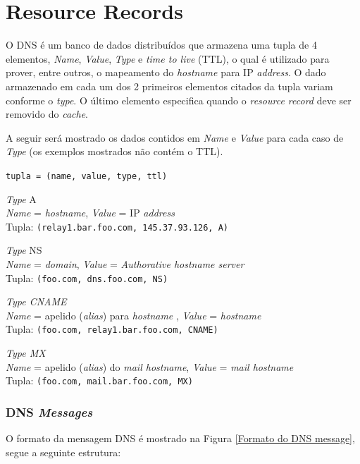 \hypertarget{resource-records}{%
\section{Resource Records}\label{resource-records}}

O DNS é um banco de dados distribuídos que armazena uma tupla de 4
elementos, \emph{Name}, \emph{Value}, \emph{Type} e \emph{time to live}
(TTL), o qual é utilizado para prover, entre outros, o mapeamento do
\emph{hostname} para IP \emph{address}. O dado armazenado em cada um dos
2 primeiros elementos citados da tupla variam conforme o \emph{type}. O
último elemento especifica quando o \emph{resource record} deve ser
removido do \emph{cache}.

A seguir será mostrado os dados contidos em \emph{Name} e \emph{Value}
para cada caso de \emph{Type} (os exemplos mostrados não contém o TTL).

\texttt{tupla\ =\ (name,\ value,\ type,\ ttl)}

\emph{Type} A\\
\emph{Name} = \emph{hostname}, \emph{Value} = IP \emph{address}\\
Tupla: \texttt{(relay1.bar.foo.com,\ 145.37.93.126,\ A)}

\emph{Type} NS\\
\emph{Name} = \emph{domain}, \emph{Value} = \emph{Authorative hostname
server}\\
Tupla: \texttt{(foo.com,\ dns.foo.com,\ NS)}

\emph{Type CNAME}\\
\emph{Name} = apelido (\emph{alias}) para \emph{hostname} , \emph{Value}
= \emph{hostname}\\
Tupla: \texttt{(foo.com,\ relay1.bar.foo.com,\ CNAME)}

\emph{Type MX}\\
\emph{Name} = apelido (\emph{alias}) do \emph{mail hostname},
\emph{Value} = \emph{mail hostname}\\
Tupla: \texttt{(foo.com,\ mail.bar.foo.com,\ MX)}


\hypertarget{dns-messages}{%
\subsubsection{\texorpdfstring{DNS
\emph{Messages}}{DNS Messages}}\label{dns-messages}}



O formato da mensagem DNS é mostrado na Figura \ref{Formato do DNS message}, segue a seguinte
estrutura:

